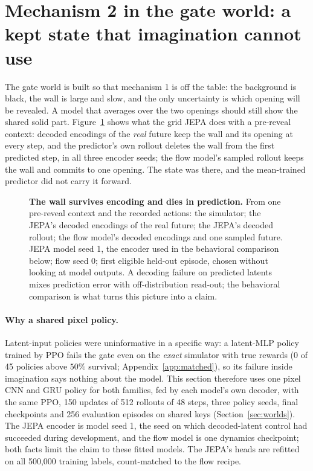 \section{Mechanism 2 in the gate world: a kept state that imagination cannot use}
\label{sec:planning}

The gate world is built so that mechanism 1 is off the table: the background is black, the wall is
large and slow, and the only uncertainty is which opening will be revealed. A model that averages
over the two openings should still show the shared solid part. Figure~\ref{fig:gate-filmstrip}
shows what the grid JEPA does with a pre-reveal context: decoded encodings of the \emph{real}
future keep the wall and its opening at every step, and the predictor's own rollout deletes the
wall from the first predicted step, in all three encoder seeds; the flow model's sampled rollout
keeps the wall and commits to one opening. The state was there, and the mean-trained predictor did
not carry it forward.

\begin{figure}[t]
\centering
{}
\caption{\textbf{The wall survives encoding and dies in prediction.} From one pre-reveal context
and the recorded actions: the simulator; the JEPA's decoded encodings of the real future; the
JEPA's decoded rollout; the flow model's decoded encodings and one sampled future. JEPA model
seed 1, the encoder used in the behavioral comparison below; flow seed 0; first eligible held-out
episode, chosen without looking at model outputs. A decoding failure on predicted latents mixes
prediction error with off-distribution read-out; the behavioral comparison is what turns this
picture into a claim.}
\label{fig:gate-filmstrip}
\end{figure}

\paragraph{Why a shared pixel policy.}
Latent-input policies were uninformative in a specific way: a latent-MLP policy trained by PPO
fails the gate even on the \emph{exact} simulator with true rewards (0 of 45 policies above $50\%$
survival; Appendix~\ref{app:matched}), so its failure inside imagination says nothing about the
model. This section therefore uses one pixel CNN and GRU policy for both families, fed by each
model's own decoder, with the same PPO, 150 updates of 512 rollouts of 48 steps, three policy
seeds, final checkpoints and 256 evaluation episodes on shared keys (Section~\ref{sec:worlds}).
The JEPA encoder is model seed 1, the seed on which decoded-latent control had succeeded during
development, and the flow model is one dynamics checkpoint; both facts limit the claim to these
fitted models. The JEPA's heads are refitted on all 500,000 training labels, count-matched to the
flow recipe.

